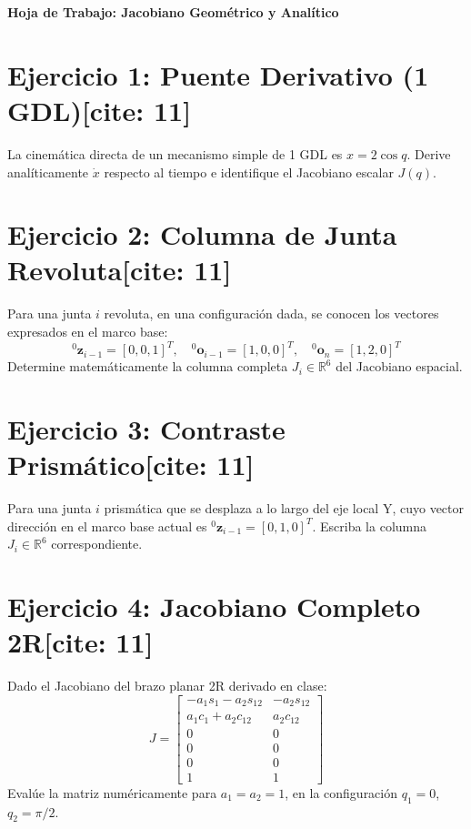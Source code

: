 \documentclass[11pt, a4paper]{article}
\begin{document}
\begin{center}
    \Large\textbf{\textcolor{ucbblue}{Hoja de Trabajo: Jacobiano Geométrico y Analítico}}\\[0.2cm]
\end{center}

\vspace{0.4cm}

\section*{Ejercicio 1: Puente Derivativo (1 GDL)[cite: 11]}
La cinemática directa de un mecanismo simple de 1 GDL es $x = 2\cos q$.
Derive analíticamente $\dot{x}$ respecto al tiempo e identifique el Jacobiano escalar $J(q)$.
\vspace{1.5cm}

\section*{Ejercicio 2: Columna de Junta Revoluta[cite: 11]}
Para una junta $i$ revoluta, en una configuración dada, se conocen los vectores expresados en el marco base:
\begin{equation*}
    {}^0\mathbf{z}_{i-1} = [0, 0, 1]^T, \quad {}^0\mathbf{o}_{i-1} = [1, 0, 0]^T, \quad {}^0\mathbf{o}_n = [1, 2, 0]^T
\end{equation*}
Determine matemáticamente la columna completa $J_i \in \mathbb{R}^6$ del Jacobiano espacial.
\vspace{4cm}

\section*{Ejercicio 3: Contraste Prismático[cite: 11]}
Para una junta $i$ prismática que se desplaza a lo largo del eje local Y, cuyo vector dirección en el marco base actual es ${}^0\mathbf{z}_{i-1} = [0, 1, 0]^T$. Escriba la columna $J_i \in \mathbb{R}^6$ correspondiente.
\vspace{2cm}

\section*{Ejercicio 4: Jacobiano Completo 2R[cite: 11]}
Dado el Jacobiano del brazo planar 2R derivado en clase:
\begin{equation*}
    J = \begin{bmatrix}
    -a_1s_1-a_2s_{12} & -a_2s_{12} \\
    a_1c_1+a_2c_{12} & a_2c_{12} \\
    0 & 0 \\ 0 & 0 \\ 0 & 0 \\ 1 & 1
    \end{bmatrix}
\end{equation*}
Evalúe la matriz numéricamente para $a_1=a_2=1$, en la configuración $q_1=0$, $q_2=\pi/2$.
\vspace{3cm}
\end{document}
